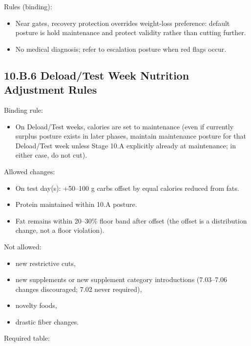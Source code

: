 \documentclass[10pt]{article}
\begin{document}
\endgroup

Rules (binding):

\begin{itemize}
\item Near gates, recovery protection overrides weight-loss preference: default posture is hold maintenance and protect validity rather than cutting further.
\item No medical diagnosis; refer to escalation posture when red flags occur.
\end{itemize}

\newpage
\subsection*{10.B.6 Deload/Test Week Nutrition Adjustment Rules}
{}

Binding rule:

\begin{itemize}
\item On Deload/Test weeks, calories are set to maintenance (even if currently surplus posture exists in later phases, maintain maintenance posture for that Deload/Test week unless Stage 10.A explicitly already at maintenance; in either case, do not cut).
\end{itemize}

Allowed changes:

\begin{itemize}
\item On test day(s): +50–100 g carbs offset by equal calories reduced from fats.
\item Protein maintained within 10.A posture.
\item Fat remains within 20–30\% floor band after offset (the offset is a distribution change, not a floor violation).
\end{itemize}

Not allowed:

\begin{itemize}
\item new restrictive cuts,
\item new supplements or new supplement category introductions (7.03–7.06 changes discouraged; 7.02 never required),
\item novelty foods,
\item drastic fiber changes.
\end{itemize}

Required table:
\end{document}
